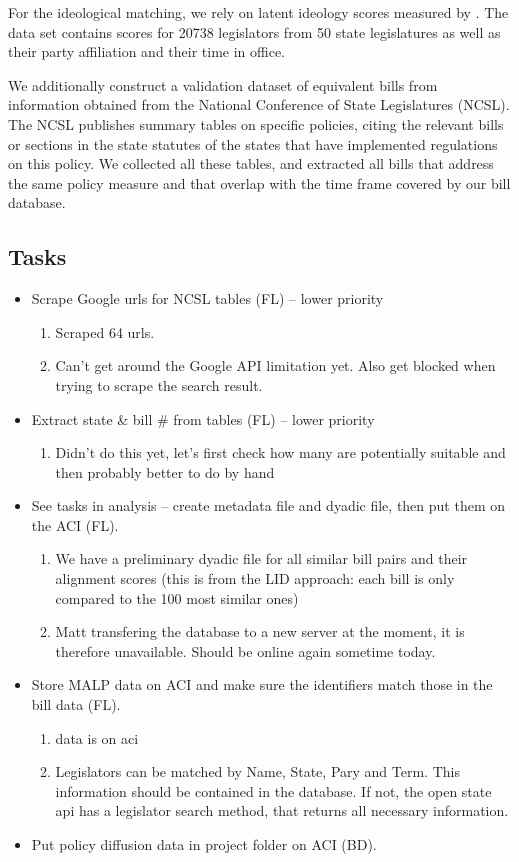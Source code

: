 \documentclass[12pt]{article} %
\begin{document}
For the ideological matching, we rely on latent ideology scores measured by \citep{shor2011}. The data set contains scores for 20738 legislators from 50 state legislatures as well as their party affiliation and their time in office. 

We additionally construct a validation dataset of equivalent bills from information obtained from the National Conference of State Legislatures (NCSL). The NCSL publishes summary tables on specific policies, citing the relevant bills or sections in the state statutes of the states that have implemented regulations on this policy. We collected all these tables, and extracted all bills that address the same policy measure and that overlap with the time frame covered by our bill database.


\subsection{Tasks}
\begin{itemize}
\item Scrape Google urls for NCSL tables (FL) -- lower priority
    \begin{enumerate}
        \item Scraped 64 urls. 
        \item Can't get around the Google API limitation yet. Also get blocked when trying to scrape the search result.
    \end{enumerate}

\item Extract state  \& bill \# from tables (FL) -- lower priority
    \begin{enumerate}
        \item Didn't do this yet, let's first check how many are potentially suitable and then probably better to do by hand
    \end{enumerate}
\item See tasks in analysis -- create metadata file and dyadic file, then put them on the ACI (FL).
    \begin{enumerate}
        \item We have a preliminary dyadic file for all similar bill pairs and their alignment scores (this is from the LID approach: each bill is only compared to the 100 most similar ones)
        \item Matt transfering the database to a new server at the moment, it is therefore unavailable. Should be online again sometime today.
    \end{enumerate}
\item Store MALP data on ACI and make sure the identifiers match those in the bill data (FL). 
    \begin{enumerate}
        \item data is on aci
        \item Legislators can be matched by Name, State, Pary and Term. This information should be contained in the database. If not, the open state api has a legislator search method, that returns all necessary information.
    \end{enumerate}
\item Put policy diffusion data in project folder on ACI (BD).
\end{itemize}
\end{document}
